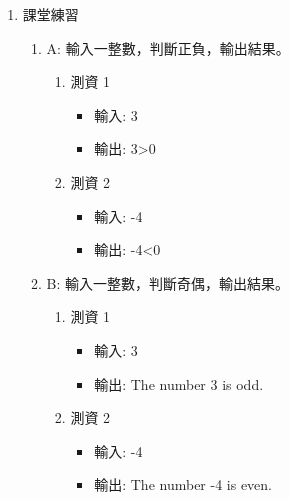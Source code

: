 \documentclass[a4paper,12pt]{article}
\begin{document}
\begin{enumerate}
\item 課堂練習
\label{CPP_ifelse_practice1}
\begin{enumerate}
\item A: 輸入一整數，判斷正負，輸出結果。
\label{sec:orgb8a9bc1}
\begin{enumerate}
\item 測資 1
\label{sec:orgd5cc85d}
\begin{itemize}
\item 輸入: 3\\
\item 輸出: 3>0\\
\end{itemize}
\item 測資 2
\label{sec:orgaa324e8}
\begin{itemize}
\item 輸入: -4\\
\item 輸出: -4<0\\
\end{itemize}
\end{enumerate}
\item B: 輸入一整數，判斷奇偶，輸出結果。
\label{sec:org3af9dc0}
\begin{enumerate}
\item 測資 1
\label{sec:org73946bf}
\begin{itemize}
\item 輸入: 3\\
\item 輸出: The number 3 is odd.\\
\end{itemize}
\item 測資 2
\label{sec:orga1f488c}
\begin{itemize}
\item 輸入: -4\\
\item 輸出: The number -4 is even.\\
\end{itemize}
\end{enumerate}
\end{enumerate}
\end{enumerate}
\end{document}
